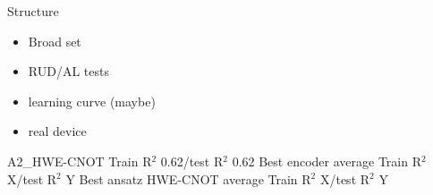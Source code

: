 \documentclass[journal=jacsat,manuscript=article]{achemso}
\begin{document}
\begin{figure}[H]
\begin{subfigure}[b]{0.49\textwidth}
		\caption{}
		\label{fig:BSE16_learningcurve}
	\end{subfigure}
	\caption{}
	\label{fig:BSE_LC}	
\end{figure}








Structure
\begin{itemize}
	\item Broad set
	\item RUD/AL tests
	\item learning curve (maybe)
	\item real device 
\end{itemize}

A2\_HWE-CNOT Train R$^{2}$ 0.62/test R$^{2}$ 0.62 
Best encoder average Train R$^{2}$ X/test R$^{2}$ Y
Best ansatz HWE-CNOT average Train R$^{2}$ X/test R$^{2}$ Y
\end{document}
